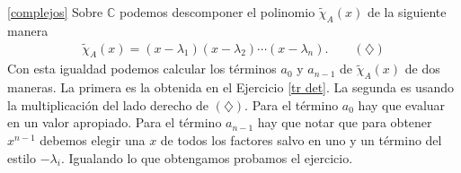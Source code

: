 \ref{complejos} Sobre $\mathbb{C}$ podemos descomponer el polinomio $\tilde\chi_A(x)$ de la siguiente manera
\begin{align*}
\tilde\chi_A(x)=(x-\lambda_1)(x-\lambda_2)\cdots(x-\lambda_n). \qquad (\diamondsuit)
\end{align*}
Con esta igualdad podemos calcular los términos $a_0$ y $a_{n-1}$ de $\tilde\chi_A(x)$ de dos maneras. La primera es la obtenida en el Ejercicio \ref{tr det}. La segunda es usando la multiplicación del lado derecho de $(\diamondsuit)$. Para el término $a_0$ hay que evaluar en un valor apropiado. Para el término $a_{n-1}$ hay que notar que para obtener $x^{n-1}$ debemos elegir una $x$ de todos los factores salvo en uno y un término del estilo $-\lambda_i$. Igualando lo que obtengamos probamos el ejercicio.

